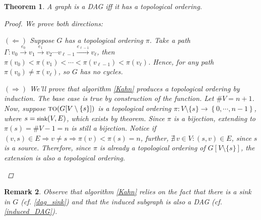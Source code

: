 \documentclass[12pt]{article}
\let\RA\Rightarrow
\let\LA\Leftarrow
\newcommand{\NExist}[1]{\nexists\,{#1}:}
\newcommand{\seq}[2][0]{\left\{{#1},\cdots,{#2}\right\}}
\newcommand{\scrf}[1]{{\scriptstyle\textup{\footnotesize #1}}}
\newcommand{\rto}[1]{\overset{\displaystyle #1}{\longrightarrow}}
\newcommand{\sm}[1]{\setminus\{#1\}}
\newtheorem{theorem}{Theorem}[subsection]
\newtheorem{remark}[theorem]{Remark}
\begin{document}
\begin{theorem}
  A graph is a DAG iff it has a topological ordering.
  \begin{proof}
    We prove both directions:
    \begin{compactitem}
      \item[$(\LA)$] Suppose $G$ has a topological ordering $\pi$. Take a path $\Gamma:v_0\rto{e_0}v_1\rto{e_1}v_2\cdots v_{\ell-1}\rto{e_{\ell-1}}v_\ell$, then $\pi(v_0)<\pi(v_1)<\cdots<\pi(v_{\ell-1})<\pi(v_\ell)$. Hence, for any path $\pi(v_0)\neq\pi(v_\ell)$, so $G$ has no cycles.
      \item[$(\RA)$] We'll prove that algorithm \ref{Kahn} produces a topological ordering by induction. The base case is true by construction of the function. Let $\#V=n+1$. Now, suppose $\scrf{TO}(G[V\sm{s}])$ is a topological ordering $\pi: V\sm{s}\to\seq{n-1}$, where $s=\scrf{sink}(V,E)$, which exists by theorem. Since $\pi$ is a bijection, extending to $\pi(s)=\#V-1=n$ is still a bijection. Notice if $(v,s)\in E\RA v\neq s\RA \pi(v)<\pi(s)=n$, further, $\NExist{v\in V}(s,v)\in E$, since $s$ is a source. Therefore, since $\pi$ is already a topological ordering of $G[V\sm{s}]$, the extension is also a topological ordering.
    \end{compactitem}
  \end{proof}
\end{theorem}

\begin{remark}
  Observe that algorithm \ref{Kahn} relies on the fact that there is a sink in $G$ (cf. \ref{dag_sink}) and that the induced subgraph is also a DAG (cf. \ref{induced_DAG}).
\end{remark}
\end{document}
